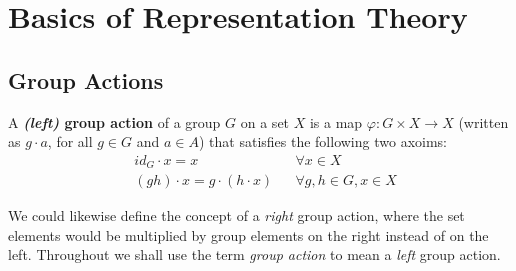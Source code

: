 
\chapter{Basics of Representation Theory} %





%
\section {Group Actions}
\begin{defn}\label{def-grp-action}
A  \textbf{\textit{(left)} group action} of a group $G$ on a set $X$ is a map $\varphi \colon G \times X \to X$ (written as $g \cdot a$, for all $g \in G$ and $a \in A$) that satisfies the following two axoims:
\begin{align}
\label{grp-action-axiom-1}&id_G \cdot  x = x && \forall x \in X\\
\label{grp-action-axiom-2}&(gh) \cdot x  = g \cdot (h \cdot x) && \forall g,h \in G, x \in X
\end{align}
\end{defn}
\begin{note}
We could likewise define the concept of a \textit{right} group action, where the set elements would be multiplied by group elements on the right instead of on the left.  Throughout we shall use the term \textit{group action} to mean a \textit{left} group action.
\end{note}


